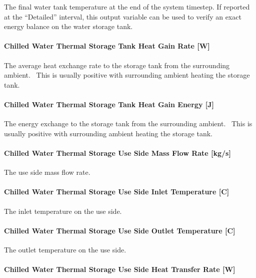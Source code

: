 The final water tank temperature at the end of the system timestep. If reported at the ``Detailed'' interval, this output variable can be used to verify an exact energy balance on the water storage tank.

\paragraph{Chilled Water Thermal Storage Tank Heat Gain Rate {[}W{]}}\label{chilled-water-thermal-storage-tank-heat-gain-rate-w}

The average heat exchange rate to the storage tank from the surrounding ambient.~ This is usually positive with surrounding ambient heating the storage tank.

\paragraph{Chilled Water Thermal Storage Tank Heat Gain Energy {[}J{]}}\label{chilled-water-thermal-storage-tank-heat-gain-energy-j}

The energy exchange to the storage tank from the surrounding ambient.~ This is usually positive with surrounding ambient heating the storage tank.

\paragraph{Chilled Water Thermal Storage Use Side Mass Flow Rate {[}kg/s{]}}\label{chilled-water-thermal-storage-use-side-mass-flow-rate-kgs}

The use side mass flow rate.

\paragraph{Chilled Water Thermal Storage Use Side Inlet Temperature {[}C{]}}\label{chilled-water-thermal-storage-use-side-inlet-temperature-c}

The inlet temperature on the use side.

\paragraph{Chilled Water Thermal Storage Use Side Outlet Temperature {[}C{]}}\label{chilled-water-thermal-storage-use-side-outlet-temperature-c}

The outlet temperature on the use side.

\paragraph{Chilled Water Thermal Storage Use Side Heat Transfer Rate {[}W{]}}\label{chilled-water-thermal-storage-use-side-heat-transfer-rate-w}

